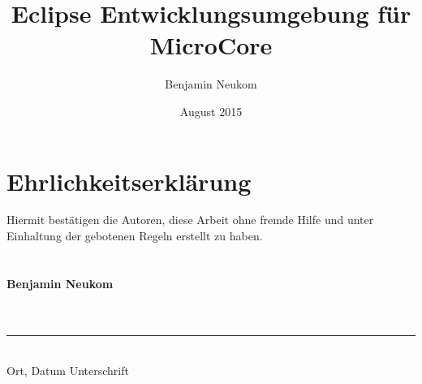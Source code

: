 \documentclass[listof=totocnumbered,bibliography=totocnumbered]{scrreprt}
\numberwithin{equation}{subsection}
\begin{document}
\subject{Bachelor-Thesis}
\title{Eclipse Entwicklungsumgebung für MicroCore}
\author{Benjamin Neukom}
\date{August 2015\\}
\publishers{Betreuer: Carlo Nicola}

\maketitle

\tableofcontents










\appendix


{}

\newpage

\listoffigures
\listoftables

\newpage
\chapter{Ehrlichkeitserklärung}
Hiermit bestätigen die Autoren, diese Arbeit ohne fremde Hilfe und unter Einhaltung der gebotenen Regeln erstellt zu haben.
\\
\\
\\
\textbf{Benjamin Neukom}
\\
\\
\\
\rule{0.75\textwidth}{0.4pt} \\
Ort, Datum \hspace * {4cm} Unterschrift
\end{document}
